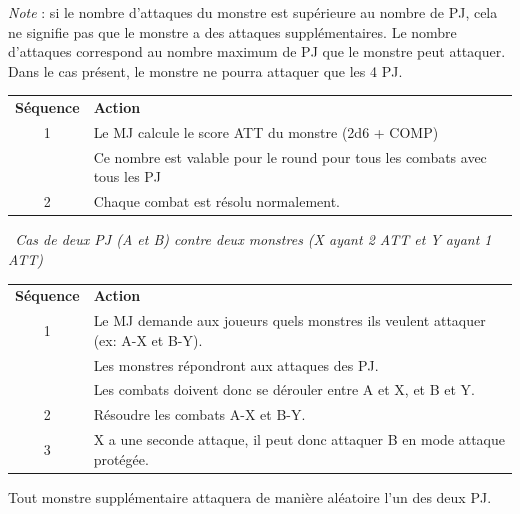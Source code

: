 \begin{frame}[b]
{\textit{Note} : si le nombre d'attaques du monstre est supérieure au nombre de PJ, cela ne signifie pas que le monstre a des attaques supplémentaires. Le nombre d'attaques correspond au nombre maximum de PJ que le monstre peut attaquer. Dans le cas présent, le monstre ne pourra attaquer que les 4 PJ.

\vspace{0.2cm}

\begin{tabular}{cp{7.1cm}}
\textbf{Séquence} & \textbf{Action} \\
         1 & Le MJ calcule le score ATT du monstre (2d6 + COMP)                          \\
           & Ce nombre  est valable pour le round pour tous les combats avec tous les PJ \\
         2 & Chaque combat est résolu normalement.                                       \\
\end{tabular}

\vspace{0.2cm}

\textit{\mybullet\ Cas de deux PJ (A et B) contre deux monstres (X ayant 2 ATT et Y ayant 1 ATT)}

\vspace{0.2cm}

\begin{tabular}{cp{7.1cm}}
\textbf{Séquence} & \textbf{Action} \\
         1 & Le MJ demande aux joueurs quels monstres ils veulent attaquer (ex: A-X et B-Y). \\
           & Les monstres répondront aux attaques des PJ.                                    \\
           & Les combats doivent donc se dérouler entre A et X, et B et Y.                   \\
         2 & Résoudre les combats A-X et B-Y.                                                \\
         3 & X a une seconde attaque, il peut donc attaquer B en mode attaque protégée.      \\
\end{tabular}

\vspace{0.2cm}

Tout monstre supplémentaire attaquera de manière aléatoire l'un des deux PJ.


}
\end{frame}
